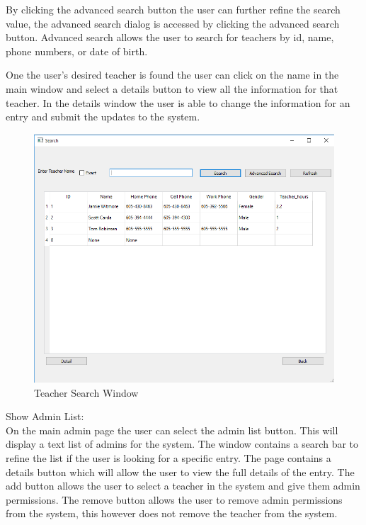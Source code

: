By clicking the advanced search button the user can further refine the search value, the advanced search dialog is accessed by clicking the advanced search button. Advanced search allows the user to search for teachers by id, name, phone numbers, or date of birth.

One the user's desired teacher is found the user can click on the name in the main window and select a details button to view all the information for that teacher.  In the details window the user is able to change the information for an entry and submit the updates to the system.\\

\begin{figure}
  \includegraphics[width=\linewidth]{pics/userGuide/teacherSearch.png}
  \caption{Teacher Search Window}
  \label{fig:User doc: Teacher Search}
\end{figure}

Show Admin List:\\
On the main admin page the user can select the admin list button. This will display a text list of admins for the system. The window contains a search bar to refine the list if the user is looking for a specific entry. The page contains a details button which will allow the user to view the full details of the entry. The add button allows the user to select a teacher in the system and give them admin permissions.  The remove button allows the user to remove admin permissions from the system, this however does not remove the teacher from the system.\\

